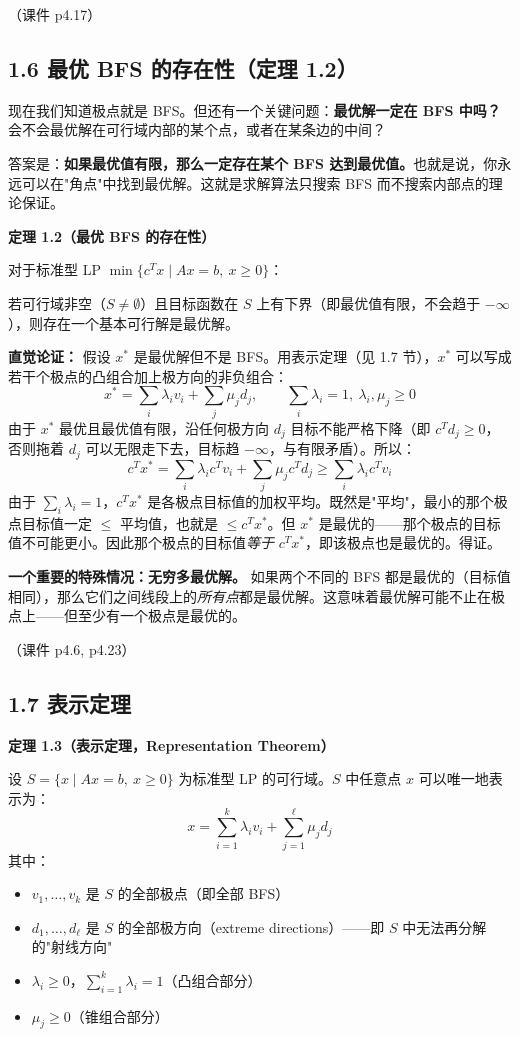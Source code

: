 （课件 p4.17）

\subsection{1.6 最优 BFS 的存在性（定理 1.2）}

现在我们知道极点就是 BFS。但还有一个关键问题：\textbf{最优解一定在 BFS 中吗？} 会不会最优解在可行域内部的某个点，或者在某条边的中间？

答案是：\textbf{如果最优值有限，那么一定存在某个 BFS 达到最优值。}也就是说，你永远可以在"角点"中找到最优解。这就是求解算法只搜索 BFS 而不搜索内部点的理论保证。

\textbf{定理 1.2（最优 BFS 的存在性）}

对于标准型 LP $\min\{c^T x \mid Ax = b,\ x \ge 0\}$：

若可行域非空（$S \neq \emptyset$）且目标函数在 $S$ 上有下界（即最优值有限，不会趋于 $-\infty$），则存在一个基本可行解是最优解。

\textbf{直觉论证：} 假设 $x^*$ 是最优解但不是 BFS。用表示定理（见 1.7 节），$x^*$ 可以写成若干个极点的凸组合加上极方向的非负组合：
\[
x^* = \sum_i \lambda_i v_i + \sum_j \mu_j d_j,\qquad \sum_i\lambda_i=1,\ \lambda_i,\mu_j\ge 0
\]
由于 $x^*$ 最优且最优值有限，沿任何极方向 $d_j$ 目标不能严格下降（即 $c^T d_j\ge 0$，否则拖着 $d_j$ 可以无限走下去，目标趋 $-\infty$，与有限矛盾）。所以：
\[
c^T x^* = \sum_i \lambda_i c^T v_i + \sum_j \mu_j c^T d_j \ge \sum_i \lambda_i c^T v_i
\]
由于 $\sum_i\lambda_i=1$，$c^T x^*$ 是各极点目标值的加权平均。既然是"平均"，最小的那个极点目标值一定 $\le$ 平均值，也就是 $\le c^T x^*$。但 $x^*$ 是最优的——那个极点的目标值不可能更小。因此那个极点的目标值\emph{等于} $c^T x^*$，即该极点也是最优的。得证。

\textbf{一个重要的特殊情况：无穷多最优解。} 如果两个不同的 BFS 都是最优的（目标值相同），那么它们之间线段上的\emph{所有点}都是最优解。这意味着最优解可能不止在极点上——但至少有一个极点是最优的。

（课件 p4.6, p4.23）

\subsection{1.7 表示定理}

\textbf{定理 1.3（表示定理，Representation Theorem）}

设 $S = \{x \mid Ax = b,\ x \ge 0\}$ 为标准型 LP 的可行域。$S$ 中任意点 $x$ 可以唯一地表示为：
\[
x = \sum_{i=1}^{k} \lambda_i v_i + \sum_{j=1}^{\ell} \mu_j d_j
\]
其中：
\begin{itemize}
  \item $v_1,\dots,v_k$ 是 $S$ 的全部极点（即全部 BFS）
  \item $d_1,\dots,d_\ell$ 是 $S$ 的全部极方向（extreme directions）——即 $S$ 中无法再分解的"射线方向"
  \item $\lambda_i \ge 0$，$\sum_{i=1}^k \lambda_i = 1$（凸组合部分）
  \item $\mu_j \ge 0$（锥组合部分）
\end{itemize}

